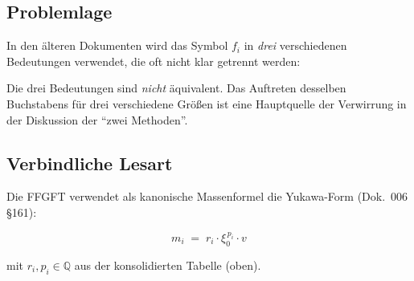 \subsection*{Problemlage}

In den älteren Dokumenten wird das Symbol $f_i$ in \emph{drei}
verschiedenen Bedeutungen verwendet, die oft nicht klar getrennt
werden:

\begin{center}
\renewcommand{\arraystretch}{1.4}
{\footnotesize
{}
}
\renewcommand{\arraystretch}{1.0}
\end{center}

Die drei Bedeutungen sind \emph{nicht} äquivalent. Das Auftreten
desselben Buchstabens für drei verschiedene Größen ist eine
Hauptquelle der Verwirrung in der Diskussion der \enquote{zwei
Methoden}.

\subsection*{Verbindliche Lesart}

Die FFGFT verwendet als kanonische Massenformel die Yukawa-Form
(Dok.~006 §161):

\begin{equation}
  \boxed{\;m_i \;=\; r_i \cdot \xi_0^{\,p_i} \cdot v\;}
  \tag{210.9}
\end{equation}

mit $r_i, p_i \in \mathbb{Q}$ aus der konsolidierten Tabelle (oben).

